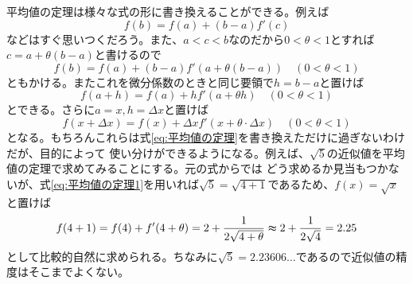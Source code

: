 \documentclass[a4j,dvipdfmx]{jsarticle}
\begin{document}
                    平均値の定理は様々な式の形に書き換えることができる。例えば
                    \begin{equation}
                        f(b)=f(a)+(b-a)f'(c)
                    \end{equation}
                    などはすぐ思いつくだろう。また、$a<c<b$なのだから$0<\theta<1$とすれば$c=a+\theta(b-a)$と書けるので
                    \begin{equation}
                        f(b)=f(a)+(b-a)f'(a+\theta(b-a))\quad(0<\theta<1)
                    \end{equation}
                    ともかける。またこれを微分係数のときと同じ要領で$h=b-a$と置けば
                    \begin{equation}
                        f(a+h)=f(a)+hf'(a+\theta h)\quad(0<\theta<1)\label{eq:平均値の定理1}
                    \end{equation}
                    とできる。さらに$a=x,h=\Delta x$と置けば
                    \begin{equation}
                        f(x+\Delta x)=f(x)+\Delta xf'(x+\theta\cdot\Delta x)\quad (0<\theta<1)\label{eq:平均値の定理x用}
                    \end{equation}
                    となる。もちろんこれらは式\ref{eq:平均値の定理}を書き換えただけに過ぎないわけだが、目的によって
                    使い分けができるようになる。例えば、$\sqrt{5}$の近似値を平均値の定理で求めてみることにする。元の式からでは
                    どう求めるか見当もつかないが、式\ref{eq:平均値の定理1}を用いれば$\sqrt{5}=\sqrt{4+1}$であるため、$f(x)=\sqrt{x}$と置けば
                    \begin{equation*}
                        f(4+1)=f(4)+f'(4+\theta)=2+\frac{1}{2\sqrt{4+\theta}}\thickapprox 2+\frac{1}{2\sqrt{4}}=2.25
                    \end{equation*}
                    として比較的自然に求められる。ちなみに$\sqrt{5}=2.23606\dots$であるので近似値の精度はそこまでよくない。
                \clearpage
\end{document}
